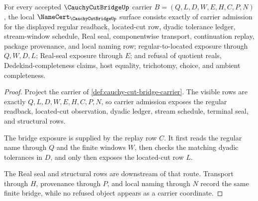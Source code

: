 \begin{theorem}
\label{thm:cauchy-cut-bridge-namecert-obligations}
For every accepted $\CauchyCutBridgeUp$ carrier $B=(Q,L,D,W,E,H,C,P,N)$, the local $\NameCert_{\CauchyCutBridgeUp}$ surface consists exactly of carrier admission for the displayed regular readback, located-cut row, dyadic tolerance ledger, stream-window schedule, Real seal, componentwise transport, continuation replay, package provenance, and local naming row; regular-to-located exposure through $Q,W,D,L$; Real-seal exposure through $E$; and refusal of quotient reals, Dedekind-completeness claims, host equality, trichotomy, choice, and ambient completeness.
\end{theorem}
\begin{proof}
Project the carrier of \autoref{def:cauchy-cut-bridge-carrier}. The visible rows are exactly $Q,L,D,W,E,H,C,P,N$, so carrier admission exposes the regular readback, located-cut observation, dyadic ledger, stream schedule, terminal seal, and structural rows.

The bridge exposure is supplied by the replay row $C$. It first reads the regular name through $Q$ and the finite windows $W$, then checks the matching dyadic tolerances in $D$, and only then exposes the located-cut row $L$.

The Real seal and structural rows are downstream of that route. Transport through $H$, provenance through $P$, and local naming through $N$ record the same finite bridge, while no refused object appears as a carrier coordinate.
\end{proof}

